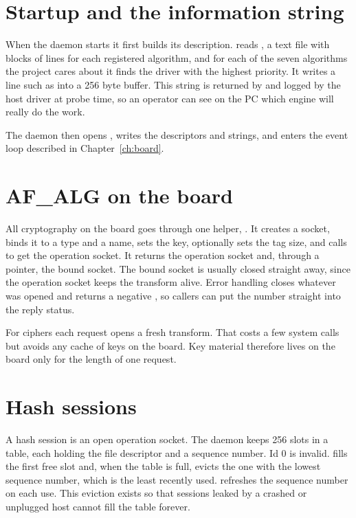 \section{Startup and the information string}

When the daemon starts it first builds its description.  reads , a text file with blocks of lines for each registered algorithm, and for each of the seven algorithms the project cares about it finds the driver with the highest priority. It writes a line such as  into a 256 byte buffer. This string is returned by  and logged by the host driver at probe time, so an operator can see on the PC which engine will really do the work.

The daemon then opens , writes the descriptors and strings, and enters the event loop described in Chapter~\ref{ch:board}.

\section{AF\_ALG on the board}

All cryptography on the board goes through one helper, . It creates a socket, binds it to a type and a name, sets the key, optionally sets the tag size, and calls  to get the operation socket. It returns the operation socket and, through a pointer, the bound socket. The bound socket is usually closed straight away, since the operation socket keeps the transform alive. Error handling closes whatever was opened and returns a negative , so callers can put the number straight into the reply status.

For ciphers each request opens a fresh transform. That costs a few system calls but avoids any cache of keys on the board. Key material therefore lives on the board only for the length of one request.

\section{Hash sessions}

A hash session is an open operation socket. The daemon keeps 256 slots in a table, each holding the file descriptor and a sequence number. Id 0 is invalid.  fills the first free slot and, when the table is full, evicts the one with the lowest sequence number, which is the least recently used.  refreshes the sequence number on each use. This eviction exists so that sessions leaked by a crashed or unplugged host cannot fill the table forever.


